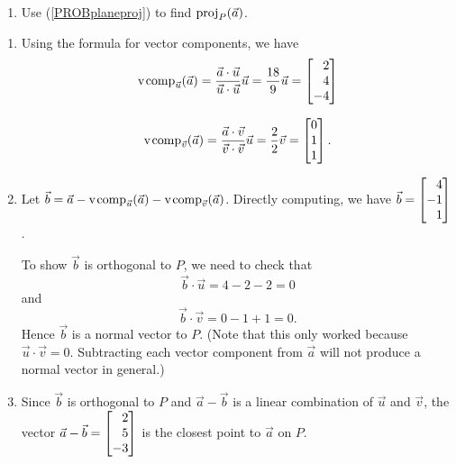\begin{exercises}
\begin{problist}
\begin{enumerate}
			\item Use (\ref{PROBplaneproj}) to find
				$\operatorname{proj}_{P} (\vec a)$.
		\end{enumerate}


		\begin{solution}

			\begin{enumerate}
				\item Using the formula for vector components, we
					have
					\[
						\Comp_{\vec u}(\vec a) = \frac{\vec
						a \cdot \vec u}{\vec u \cdot
						\vec u}\vec u = \frac{18}{9}\vec
						u = \mat{2\\4\\-4}
					\]



					\[
						\Comp_{\vec v}(\vec a) = \frac{\vec
						a \cdot \vec v}{\vec v \cdot
						\vec v}\vec u = \frac{2}{2}\vec
						v = \mat{0\\1\\1}.
					\]


				\item Let $\vec b = \vec a-\operatorname{\operatorname{v\hspace{1pt}comp}}_{\vec u}(\vec a)-\operatorname{\operatorname{v\hspace{1pt}comp}}_{\vec
					v}(\vec a)$. Directly computing, we have
					$\vec b = \mat{ 4 \\-1 \\1 }$.

					To show $\vec b$ is orthogonal to $P$,
					we need to check that
					\[
						\vec b \cdot \vec u = 4-2-2 = 0
					\]
					 and
					\[
						\vec b \cdot \vec v = 0-1+1 = 0.
					\]
					 Hence $\vec b$ is a normal vector to
					$P$. (Note that this only worked because
					$\vec u\cdot \vec v = 0$. Subtracting
					each vector component from $\vec a$ will
					not produce a normal vector in general.)

				\item Since $\vec b$ is orthogonal to $P$ and $\vec
					a - \vec b$ is a linear combination of $\vec
					u$ and $\vec v$, the vector
					$\vec a - \vec b=\mat{2\\5\\-3}$ is the
					closest point to $\vec a$ on $P$.
			\end{enumerate}
		\end{solution}
	\end{problist}
\end{exercises}

